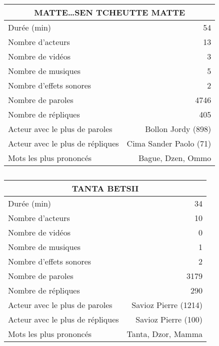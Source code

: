     \begin{table}[]
    \centering
    \caption{}
    \begin{tabular}{lr}\toprule\multicolumn{2}{c}{MATTE\ldots SEN TCHEUTTE MATTE} \\\midrule
\multicolumn{1}{l}{Durée (min)}&54\\
\multicolumn{1}{l}{Nombre d'acteurs}&13\\
\multicolumn{1}{l}{Nombre de vidéos}&3\\
\multicolumn{1}{l}{Nombre de musiques}&5\\
\multicolumn{1}{l}{Nombre d'effets sonores}&2\\
\multicolumn{1}{l}{Nombre de paroles}&4746\\
\multicolumn{1}{l}{Nombre de répliques}&405\\
\multicolumn{1}{l}{Acteur avec le plus de paroles}&Bollon Jordy (898)\\
\multicolumn{1}{l}{Acteur avec le plus de répliques}&Cima Sander Paolo (71)\\
\multicolumn{1}{l}{Mots les plus prononcés}&Bague, Dzen, Ommo\\
    \bottomrule
    \end{tabular}%
    \end{table}
    \begin{table}[]
    \centering
    \caption{}
    \begin{tabular}{lr}\toprule\multicolumn{2}{c}{TANTA BETSII} \\\midrule
\multicolumn{1}{l}{Durée (min)}&34\\
\multicolumn{1}{l}{Nombre d'acteurs}&10\\
\multicolumn{1}{l}{Nombre de vidéos}&0\\
\multicolumn{1}{l}{Nombre de musiques}&1\\
\multicolumn{1}{l}{Nombre d'effets sonores}&2\\
\multicolumn{1}{l}{Nombre de paroles}&3179\\
\multicolumn{1}{l}{Nombre de répliques}&290\\
\multicolumn{1}{l}{Acteur avec le plus de paroles}&Savioz Pierre (1214)\\
\multicolumn{1}{l}{Acteur avec le plus de répliques}&Savioz Pierre (100)\\
\multicolumn{1}{l}{Mots les plus prononcés}&Tanta, Dzor, Mamma\\
    \bottomrule
    \end{tabular}%
    \end{table}
